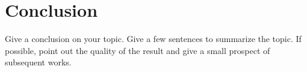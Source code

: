 \section{Conclusion}
\label{sec:conclusion}
Give a conclusion on your topic. Give a few sentences to summarize 
\exists
the topic. If possible, point out the quality of the result and give
a small prospect of subsequent works.
